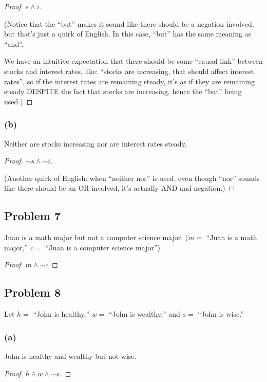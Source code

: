 \documentclass[14pt]{extarticle}
\begin{document}
\begin{proof}
$s \wedge i$.

(Notice that the ``but'' makes it sound like there should be a
negation involved, but that's just a quirk of English. In this case, ``but'' has
the same meaning as ``and''.

We have an intuitive expectation that there should be some ``causal link''
between stocks and interest rates, like: ``stocks are increasing, that should
affect interest rates'', so if the interest rates are remaining steady, it's as
if they are remaining steady DESPITE the fact that stocks are increasing, hence
the ``but'' being used.)
\end{proof}

\subsubsection{(b)}
Neither are stocks increasing nor are interest rates steady.

\begin{proof}
${\sim s} \wedge {\sim i}$.

(Another quirk of English: when ``neither nor'' is used, even though ``nor''
sounds like there should be an OR involved, it's actually AND and negation.)
\end{proof}

\subsection{Problem 7}
Juan is a math major but not a computer science major. ($m =$ “Juan is a math
major,” $c =$ “Juan is a computer science major”)

\begin{proof}
$m \wedge {\sim c}$
\end{proof}

\subsection{Problem 8}
Let $h =$ “John is healthy,” $w =$ “John is wealthy,” and
$s =$ “John is wise.”

\subsubsection{(a)}
John is healthy and wealthy but not wise.

\begin{proof}
$h \wedge w \wedge {\sim s}$.
\end{proof}
\end{document}
